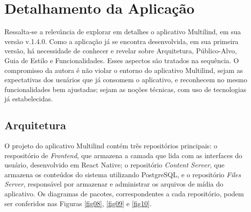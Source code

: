 \section{Detalhamento da Aplicação}
\label{sec:Detalhamento da Aplicacao}
Ressalta-se a relevância de explorar em detalhes o aplicativo Multilind, em sua versão v.1.4.0. Como a aplicação já se encontra desenvolvida, em sua primeira versão, há necessidade de conhecer e revelar sobre Arquitetura, Público-Alvo, Guia de Estilo e Funcionalidades. Esses aspectos são 
tratados na sequência. O compromisso da autora é não violar o entorno do aplicativo Multilind, sejam as expectativas dos usuários que já consomem o aplicativo, e reconhecem no mesmo funcionalidades bem ajustadas; sejam as noções técnicas, com uso de tecnologias já estabelecidas.

\subsection{Arquitetura}
\label{Arquitetura}
O projeto do aplicativo Multilind contém três repositórios principais: o respositório de \textit{Frontend}, que armazena a camada que lida com as interfaces do usuário, desenvolvido em React Native; o repositório \textit{Content Server}, que armazena os conteúdos do sistema 
utilizando PostgreSQL, e o repositório \textit{Files Server}, responsável por armazenar e administrar os arquivos de mídia do aplicativo. Os diagramas de  pacotes, correspondentes a cada repositório, podem ser conferidos nas Figuras \ref{fig08}, \ref{fig09} e \ref{fig10}.

